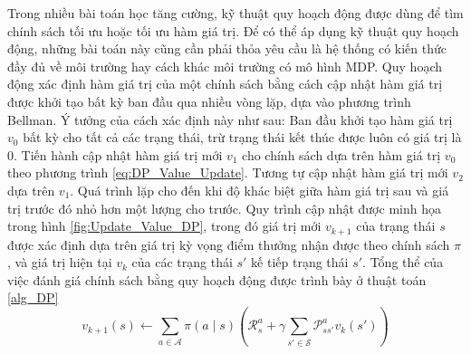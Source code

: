 Trong nhiều bài toán học tăng cường, kỹ thuật quy hoạch động được dùng để tìm chính sách tối ưu hoặc tối ưu hàm giá trị. Để có thể áp dụng kỹ thuật quy hoạch động, những bài toán này cũng cần phải thỏa yêu cầu là hệ thống có kiến thức đầy đủ về môi trường hay cách khác môi trường có mô hình MDP.
Quy hoạch động xác định hàm giá trị của một chính sách bằng cách cập nhật hàm giá trị được khởi tạo bất kỳ ban đầu qua nhiều vòng lặp, dựa vào phương trình Bellman. Ý tưởng của cách xác định này như sau: Ban đầu khởi tạo hàm giá trị $v_0$ bất kỳ cho tất cả các trạng thái, trừ trạng thái kết thúc được luôn có giá trị là 0. Tiến hành cập nhật hàm giá trị mới $v_1$ cho chính sách dựa trên hàm giá trị $v_0$ theo phương trình \ref{eq:DP_Value_Update}. Tương tự cập nhật hàm giá trị mới $v_2$ dựa trên $v_1$. Quá trình lặp cho đến khi độ khác biệt giữa hàm giá trị sau và giá trị trước đó nhỏ hơn một lượng cho trước. Quy trình cập nhật được minh họa trong hình \ref{fig:Update_Value_DP}, trong đó giá trị mới $v_{k+1}$ của trạng thái $s$ được xác định dựa trên giá trị kỳ vọng điểm thưởng nhận được theo chính sách $\pi$, và giá trị hiện tại $v_{k}$ của các trạng thái $s'$ kế tiếp trạng thái $s'$. Tổng thể của việc đánh giá chính sách bằng quy hoạch động được trình bày ở thuật toán \ref{alg_DP}
\begin{equation}
v_{k+1}(s) \leftarrow \sum_{a \in \mathcal{A}}^{}\pi(a \mid s)(\mathcal{R}_{s}^{a} + \gamma \sum_{s' \in \mathcal{S}}^{}\mathcal{P}_{ss'}^{a}v_{k}(s'))
\label{eq:DP_Value_Update}
\end{equation}		
